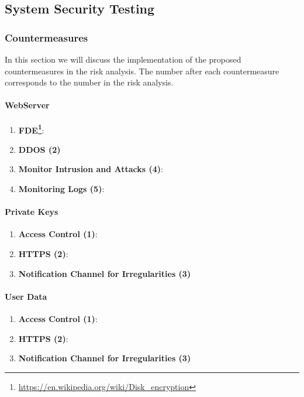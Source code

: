 \documentclass[english]{article}
\begin{document}
\subsection{System Security Testing}


\subsubsection{Countermeasures}
In this section we will discuss the implementation of the proposed countermeasures in the risk analysis. The number after each countermeasure corresponds to the number in the risk analysis.

\paragraph{WebServer}
\begin{enumerate}[label=(\alph*)] \item \textbf{FDE\footnote{\url{https://en.wikipedia.org/wiki/Disk_encryption}}}:
\item \textbf{DDOS (2)}
\item \textbf{Monitor Intrusion and Attacks (4)}:
\item \textbf{Monitoring Logs (5)}:
\end{enumerate} 

\paragraph{Private Keys}
\begin{enumerate}[label=(\alph*)]
\item \textbf{Access Control (1)}:
\item \textbf{HTTPS (2)}:
\item \textbf{Notification Channel for Irregularities (3)}
\end{enumerate} 

\paragraph{User Data}
\begin{enumerate}[label=(\alph*)]
\item \textbf{Access Control (1)}:
\item \textbf{HTTPS (2)}:
\item \textbf{Notification Channel for Irregularities (3)}
\end{enumerate} 
\end{document}
